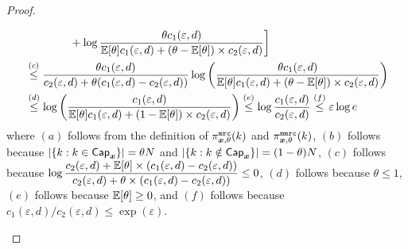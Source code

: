 \begin{proof}
\begin{enumerate}
\begin{align}
    &  \qquad \qquad + \log \dfrac{\theta c_1(\varepsilon,d)}{\mathbb{E}[\theta] c_1(\varepsilon,d) + (\theta - \mathbb{E}[\theta]) \times c_2(\varepsilon,d)} \bigg] \\
    & \stackrel{(c)}{\leq}  \dfrac{\theta c_1(\varepsilon,d)}{c_2(\varepsilon,d) +  \theta (c_1(\varepsilon,d) - c_2(\varepsilon,d))} \log \bigg( \dfrac{ \theta c_1(\varepsilon,d)}{\mathbb{E}[\theta] c_1(\varepsilon,d) + (\theta - \mathbb{E}[\theta]) \times c_2(\varepsilon,d)} \bigg) \label{eq:KL_2}\\
    & \stackrel{(d)}{\leq} \log \bigg( \dfrac{ c_1(\varepsilon,d)}{\mathbb{E}[\theta] c_1(\varepsilon,d) + (1 - \mathbb{E}[\theta]) \times c_2(\varepsilon,d)} \bigg)  \stackrel{(e)}{\leq} \log \frac{c_1(\varepsilon,d)}{c_2(\varepsilon,d)} \stackrel{(f)}{\leq} \varepsilon \log e  
\end{align}
where $(a)$ follows from the definition of $\pi^{\texttt{mrc}}_{{\boldsymbol{x}}, \theta}(k)$ and $\pi^{\texttt{mmrc}}_{{\boldsymbol{x}}, \theta}(k)$, $(b)$ follows because $|\{k : k \in \mathsf{Cap}_{{\boldsymbol{x}}}\}| = \theta N$ and $|\{k : k \notin \mathsf{Cap}_{{\boldsymbol{x}}}\}| = (1-\theta) N$, $(c)$ follows because $\log \dfrac{c_2(\varepsilon,d) + \mathbb{E}[\theta] \times (c_1(\varepsilon,d) - c_2(\varepsilon,d))}{c_2(\varepsilon,d) +  \theta \times (c_1(\varepsilon,d) - c_2(\varepsilon,d))} \leq 0$, $(d)$ follows because $\theta \leq 1$, $(e)$ follows because $\mathbb{E}[\theta] \geq 0$, and $(f)$ follows because $c_1(\varepsilon,d) / c_2(\varepsilon,d) \leq \exp{(\varepsilon)}$.
\end{enumerate}
\end{proof}

